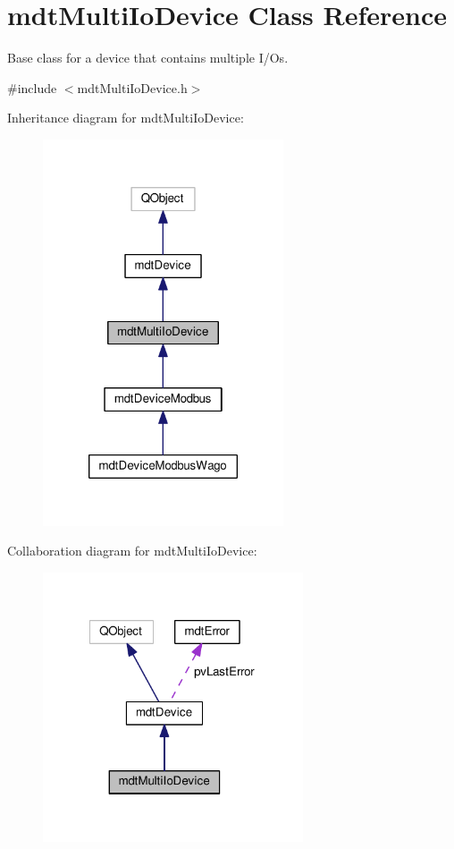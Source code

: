 \hypertarget{classmdt_multi_io_device}{\section{mdt\-Multi\-Io\-Device Class Reference}
\label{classmdt_multi_io_device}
}


Base class for a device that contains multiple I/\-Os.  




{\ttfamily \#include $<$mdt\-Multi\-Io\-Device.\-h$>$}



Inheritance diagram for mdt\-Multi\-Io\-Device\-:
\nopagebreak
\begin{figure}[H]
\begin{center}
\leavevmode
\includegraphics[width=202pt]{classmdt_multi_io_device__inherit__graph}
\end{center}
\end{figure}


Collaboration diagram for mdt\-Multi\-Io\-Device\-:
\nopagebreak
\begin{figure}[H]
\begin{center}
\leavevmode
\includegraphics[width=218pt]{classmdt_multi_io_device__coll__graph}
\end{center}
\end{figure}
